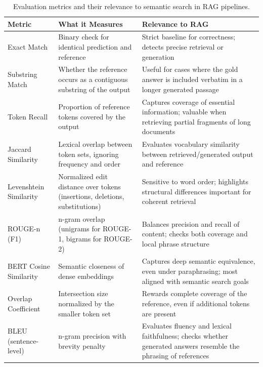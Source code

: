 \begin{table}[H]
\centering
\caption{Evaluation metrics and their relevance to semantic search in RAG pipelines.}
\begin{tabular}{|p{3cm}|p{5cm}|p{7cm}|}
\hline
\textbf{Metric} & \textbf{What it Measures} & \textbf{Relevance to RAG} \\
\hline
Exact Match & Binary check for identical prediction and reference & Strict baseline for correctness; detects precise retrieval or generation \\
\hline
Substring Match & Whether the reference occurs as a contiguous substring of the output & Useful for cases where the gold answer is included verbatim in a longer generated passage \\
\hline
Token Recall & Proportion of reference tokens covered by the output & Captures coverage of essential information; valuable when retrieving partial fragments of long documents \\
\hline
Jaccard Similarity \cite{jaccard1901distribution} & Lexical overlap between token sets, ignoring frequency and order & Evaluates vocabulary similarity between retrieved/generated output and reference \\
\hline
Levenshtein Similarity \cite{levenshtein1966binary} & Normalized edit distance over tokens (insertions, deletions, substitutions) & Sensitive to word order; highlights structural differences important for coherent retrieval \\
\hline
ROUGE-n (F1) \cite{lin2004rouge} & n-gram overlap (unigrams for ROUGE-1, bigrams for ROUGE-2) & Balances precision and recall of content; checks both coverage and local phrase structure \\
\hline
BERT Cosine Similarity \cite{reimers2019sentence} & Semantic closeness of dense embeddings & Captures deep semantic equivalence, even under paraphrasing; most aligned with semantic search goals \\
\hline
Overlap Coefficient \cite{simpson1960similarity} & Intersection size normalized by the smaller token set & Rewards complete coverage of the reference, even if additional tokens are present \\
\hline
BLEU (sentence-level) \cite{papineni2002bleu} & n-gram precision with brevity penalty & Evaluates fluency and lexical faithfulness; checks whether generated answers resemble the phrasing of references \\
\hline
\end{tabular}
\label{tab:metrics}
\end{table}

